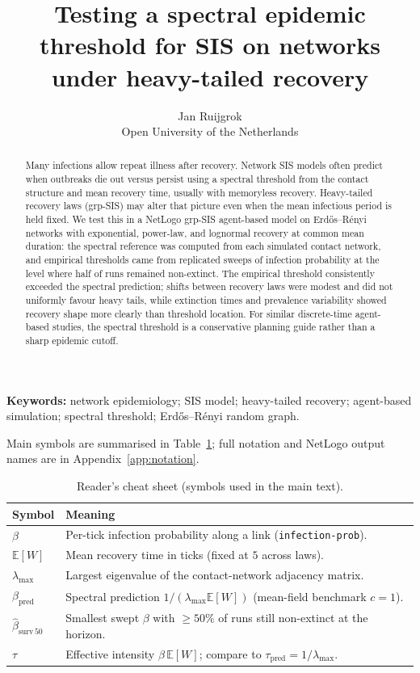 \documentclass[11pt,a4paper]{article}
\title{Testing a spectral epidemic threshold for SIS on networks under heavy-tailed recovery}
\author{Jan Ruijgrok\RepStudentIdSuffix\\
  Open University of the Netherlands}
\date{\RepReportDate}
\begin{document}
\maketitle

\begin{abstract}
Many infections allow repeat illness after recovery. Network SIS models often predict when outbreaks die out versus persist using a spectral threshold from the contact structure and mean recovery time, usually with memoryless recovery. Heavy-tailed recovery laws (grp-SIS) may alter that picture even when the mean infectious period is held fixed. We test this in a NetLogo grp-SIS agent-based model on Erd\H{o}s--R\'enyi networks with exponential, power-law, and lognormal recovery at common mean duration: the spectral reference was computed from each simulated contact network, and empirical thresholds came from replicated sweeps of infection probability at the level where half of runs remained non-extinct. The empirical threshold consistently exceeded the spectral prediction; shifts between recovery laws were modest and did not uniformly favour heavy tails, while extinction times and prevalence variability showed recovery shape more clearly than threshold location. For similar discrete-time agent-based studies, the spectral threshold is a conservative planning guide rather than a sharp epidemic cutoff.
\end{abstract}

\noindent\textbf{Keywords:} network epidemiology; SIS model; heavy-tailed recovery; agent-based simulation; spectral threshold; Erd\H{o}s--R\'enyi random graph.

\noindent Main symbols are summarised in Table~\ref{tab:notation-cheatsheet}; full notation and NetLogo output names are in Appendix~\ref{app:notation}.

\begin{table}[t]
  \centering
  \small
  \caption{Reader's cheat sheet (symbols used in the main text).}
  \label{tab:notation-cheatsheet}
  \begin{tabular}{@{}ll@{}}
    \toprule
    \textbf{Symbol} & \textbf{Meaning} \\
    \midrule
    $\beta$ & Per-tick infection probability along a link (\texttt{infection-prob}). \\
    $\mathbb{E}[W]$ & Mean recovery time in ticks (fixed at $5$ across laws). \\
    $\lambda_{\max}$ & Largest eigenvalue of the contact-network adjacency matrix. \\
    $\beta_{\mathrm{pred}}$ & Spectral prediction $1/(\lambda_{\max}\mathbb{E}[W])$ (mean-field benchmark $c{=}1$). \\
    $\hat{\beta}_{\mathrm{surv}\,50}$ & Smallest swept $\beta$ with $\ge 50\%$ of runs still non-extinct at the horizon. \\
    $\tau$ & Effective intensity $\beta\,\mathbb{E}[W]$; compare to $\tau_{\mathrm{pred}}=1/\lambda_{\max}$. \\
    \bottomrule
  \end{tabular}
\end{table}
\end{document}
